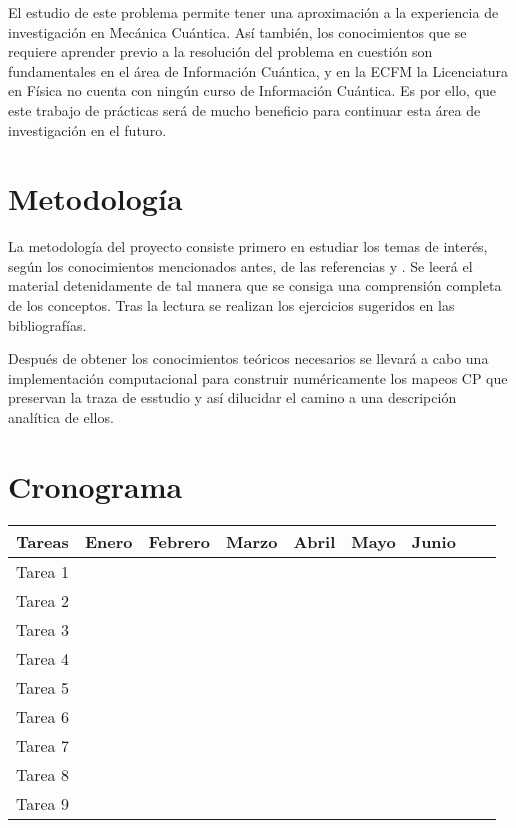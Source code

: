 \documentclass[11pt, spanish, letterpage]{article}
\newcounter{problem}[section]
\begin{document}
El estudio de este problema permite tener una aproximación a la experiencia de investigación en Mecánica Cuántica. Así también, los conocimientos que se requiere aprender previo a la resolución del problema en cuestión son fundamentales en el área de Información Cuántica, y en la ECFM la Licenciatura en Física no cuenta con ningún curso de Información Cuántica. Es por ello, que este trabajo de prácticas será de mucho beneficio para continuar esta área de investigación en el futuro.  

\section{Metodología}
La metodología del proyecto consiste primero en estudiar los temas de interés, según los conocimientos mencionados antes, de las referencias \cite{bengtsson_zyczkowski_2017} y \cite{nielsen_chuang_2011}. Se leerá el material detenidamente de tal manera que se consiga una comprensión completa de los conceptos. Tras la lectura se realizan los ejercicios sugeridos en las bibliografías. 

Después de obtener los conocimientos teóricos necesarios se llevará a cabo una implementación computacional para construir numéricamente los mapeos CP que preservan la traza de esstudio y así dilucidar el camino a una descripción analítica de ellos. 

\newpage

\section{Cronograma}
\begin{center}
	\begingroup
	\setlength{\tabcolsep}{10pt} %
	\renewcommand{\arraystretch}{1.2} %
        \begin{tabular}{|c|c|c|c|c|c|c|c|c|}
                \hline
                \textbf{Tareas} & \textbf{Enero} & \textbf{Febrero} & \textbf{Marzo} & \textbf{Abril} & \textbf{Mayo} & \textbf{Junio} \\ \hline
                Tarea 1 & \cellcolor[gray]{0.5} &  &  &  &  &	\\ \hline
                Tarea 2 & \cellcolor[gray]{0.5} & & & & &	\\ \hline
                Tarea 3 & \cellcolor[gray]{0.5} & & & & &	\\ \hline
                Tarea 4 & & \cellcolor[gray]{0.5} & & & &	\\ \hline
                Tarea 5 & & \cellcolor[gray]{0.5} & & & &	\\ \hline
                Tarea 6 & & & \cellcolor[gray]{0.5} & & &	\\ \hline
                Tarea 7 & & & \cellcolor[gray]{0.5} & & &	\\ \hline
                Tarea 8 & & & \cellcolor[gray]{0.5} & \cellcolor[gray]{0.5} & \cellcolor[gray]{0.5} &	\\ \hline
				Tarea 9 & & & & & & \cellcolor[gray]{0.5}	\\ \hline
        \end{tabular}
    \endgroup
\end{center}
\end{document}
